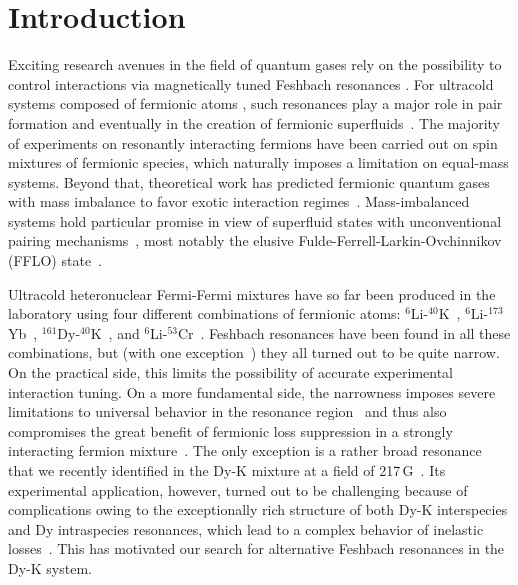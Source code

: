 \section{Introduction}
\label{sec:Introduction}

Exciting research avenues in the field of quantum gases rely on the possibility to control interactions via magnetically tuned Feshbach resonances \cite{Chin2010fri}. For ultracold systems composed of fermionic atoms \cite{Varenna2006book}, such resonances play a major role in pair formation and eventually in the creation of fermionic superfluids~\cite{Zwerger2012tbb,Strinati2018tbb,Bennemann2014both}. The majority of experiments on resonantly interacting fermions have been carried out on spin mixtures of fermionic species, which naturally imposes a limitation on equal-mass systems. Beyond that, theoretical work has predicted fermionic quantum gases with mass imbalance to favor exotic interaction regimes~\cite{Gubbels2013ifg}. Mass-imbalanced systems hold particular promise in view of superfluid states with unconventional pairing mechanisms~\cite{Gubbels2009lpi,Wang2017eeo,Pini2021bmf}, most notably the elusive Fulde-Ferrell-Larkin-Ovchinnikov (FFLO) state~\cite{Fulde1964sia,Larkin1964nss,Radzihovsky2010ifr}.

Ultracold heteronuclear Fermi-Fermi mixtures have so far been produced in the laboratory using four different combinations of fermionic atoms: $^6$Li-$^{40}$K~\cite{Taglieber2008qdt,Wille2008eau,Voigt2009uhf,Naik2011fri},
$^6$Li-$^{173}$Yb~\cite{Hara2011qdm,Green2020fri},
$^{161}$Dy-$^{40}$K~\cite{Ravensbergen2018poa,Ravensbergen2020rif}, and
$^{6}$Li-$^{53}$Cr~\cite{Neri2020roa,Ciamei2022euc,Ciamei2022ddf}.
Feshbach resonances have been found in all these combinations, but (with one exception~\cite{Ravensbergen2020rif}) they all turned out to be quite narrow. On the practical side, this limits the possibility of accurate experimental interaction tuning. On a more fundamental side, the narrowness imposes severe limitations to universal behavior in the resonance region~\cite{Chin2010fri} and thus also compromises the great benefit of fermionic loss suppression in a strongly interacting fermion mixture~\cite{Petrov2004wbd,Petrov2005dmi,Jag2016lof}.
The only exception is a rather broad resonance that we recently identified in the Dy-K mixture at a field of 217\,G~\cite{Ravensbergen2020rif}. Its experimental application, however, turned out to be challenging because of complications owing to the exceptionally rich structure of both Dy-K interspecies and Dy intraspecies resonances, which lead to a complex behavior of inelastic losses~\cite{Burdick2016lls,Soave2022lff}. This has motivated our search for alternative Feshbach resonances in the Dy-K system.

